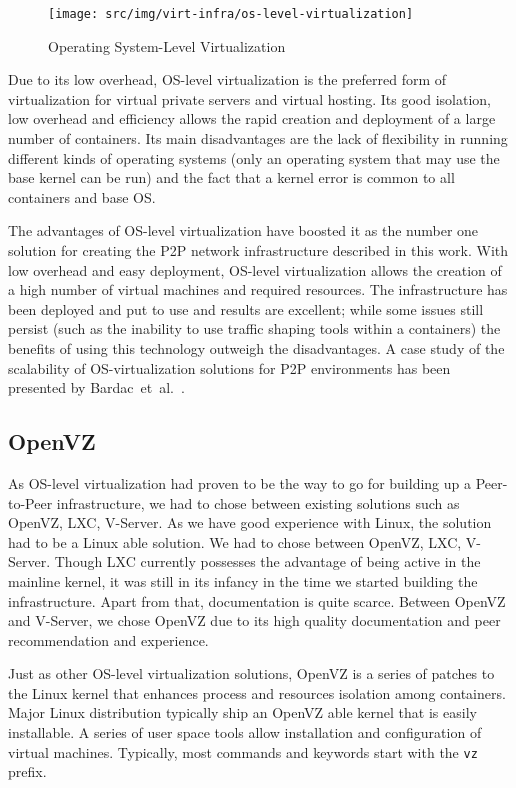 \begin{figure}
  \centering
  \texttt{[image: src/img/virt-infra/os-level-virtualization]}
  \caption{Operating System-Level Virtualization}
  \label{fig:virt-infra:os-level-virtualization}
\end{figure}

Due to its low overhead, OS-level virtualization is the preferred form of
virtualization for virtual private servers and virtual hosting. Its good
isolation, low overhead and efficiency allows the rapid creation and
deployment of a large number of containers. Its main disadvantages are the
lack of flexibility in running different kinds of operating systems (only an
operating system that may use the base kernel can be run) and the fact that a
kernel error is common to all containers and base OS.

The advantages of OS-level virtualization have boosted it as the number one
solution for creating the P2P network infrastructure described in this work.
With low overhead and easy deployment, OS-level virtualization allows the
creation of a high number of virtual machines and required resources. The
infrastructure has been deployed and put to use and results are excellent;
while some issues still persist (such as the inability to use traffic shaping
tools within a containers) the benefits of using this technology outweigh the
disadvantages. A case study of the scalability of OS-virtualization solutions
for P2P environments has been presented by
Bardac~et~al.~\cite{p2p-virt-scaling}.

\subsection{OpenVZ}

As OS-level virtualization had proven to be the way to go for building up a
Peer-to-Peer infrastructure, we had to chose between existing solutions such
as OpenVZ, LXC, V-Server. As we have good experience with Linux, the solution
had to be a Linux able solution. We had to chose between OpenVZ, LXC,
V-Server. Though LXC currently possesses the advantage of being active in the
mainline kernel, it was still in its infancy in the time we started building
the infrastructure. Apart from that, documentation is quite scarce. Between
OpenVZ and V-Server, we chose OpenVZ due to its high quality documentation
and peer recommendation and experience.

Just as other OS-level virtualization solutions, OpenVZ is a series of patches
to the Linux kernel that enhances process and resources isolation among
containers. Major Linux distribution typically ship an OpenVZ able kernel that
is easily installable. A series of user space tools allow installation and
configuration of virtual machines. Typically, most commands and keywords start
with the \texttt{vz} prefix.

